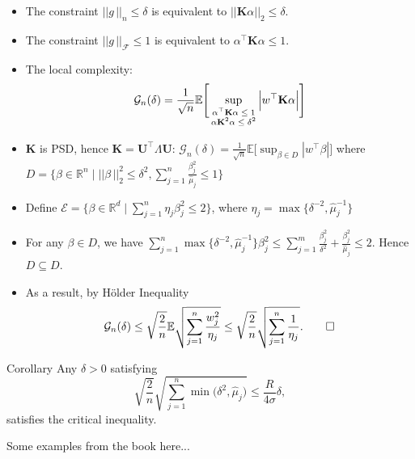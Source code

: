 \documentclass[11pt]{beamer}
\newcommand{\E}{\mathbb{E}}
\newcommand{\cF}{\mathcal{F}}
\newcommand{\cG}{\mathcal{G}}
\begin{document}
\begin{frame}
	\begin{itemize}
		\item The constraint $||g\,||_n\leq \delta$ is equivalent to $||\mathbf{K}\alpha||_2 \leq \delta$.
		\item The constraint $||g\,||_\cF\leq 1$ is equivalent to $\alpha^\top\mathbf{K}\alpha \leq 1$.
		\item The local complexity:
		\begin{equation*}
		\cG_n(\delta) = \frac{1}{\sqrt{n}}\E\Bigg[\sup_{
			\begin{scriptsize}
			\begin{matrix}
			\alpha^\top \mathbf{K} \alpha \leq 1\\
			\alpha \mathbf{K}^2\alpha \leq \delta^2
			\end{matrix}
			\end{scriptsize}}
		\Big|w^\top \mathbf{K} \alpha\Big|\Bigg]
		\end{equation*}
		\item $\mathbf{K}$ is PSD, hence $\mathbf{K} = \mathbf{U}^\top \Lambda \mathbf{U}$: $
		\cG_n(\delta) = \frac{1}{\sqrt{n}} \E\big[\sup_{\beta \in D} |w^\top \beta|\big]$
		where $D = \Big\{\beta\in \mathbb{R}^n\; \big| \;||\beta\,||_2^2 \leq \delta^2, \sum_{j = 1}^{n}\frac{\beta_j^2}{\hat \mu_j} \leq 1\Big\}$
		\item Define $\mathcal{E} = \{\beta \in \mathbb{R}^d\; \big|\; \sum_{j = 1}^{n} \eta_j \beta_j^2 \leq 2\}$, where $\eta_j = \max\{\delta^{-2}, \hat{\mu}_j^{-1}\}$
		\item For any $\beta \in D$, we have $
			\sum_{j = 1}^{n} \max\{\delta^{-2}, \hat{\mu}_j^{-1}\} \beta_j^2 \leq \sum_{j = 1}^{m} \frac{\beta_j^2}{\delta^2} + \frac{\beta_j^2}{\hat\mu_j} \leq 2.$ Hence $D \subseteq D$.
		\item As a result, by H\"older Inequality
		\begin{equation*}
			\cG_n(\delta) \leq \sqrt{\frac{2}{n}}\E\sqrt{\sum_{j = 1}^{n} \frac{w_j^2}{\eta_j}} \leq \sqrt{\frac{2}{n}}\sqrt{\sum_{j = 1}^{n} \frac{1}{\eta_j}}. \qed
		\end{equation*}
	\end{itemize}
\end{frame}

\begin{frame}
	\begin{block}{Corollary}
		Any $\delta>0$ satisfying
		\begin{equation*}
			\sqrt{\frac{2}{n}}\sqrt{\sum_{j = 1}^{n} \min\big(\delta^2, \hat\mu_j\big)} \leq \frac{R}{4\sigma} \delta,
		\end{equation*}
		satisfies the critical inequality.
	\end{block}

	Some examples from the book here...
\end{frame}
\end{document}
